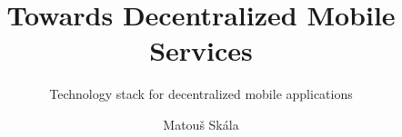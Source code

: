 \documentclass[whitelogo]{tudelft-report}
\begin{document}
\frontmatter


\title[tudelft-white]{Towards Decentralized Mobile Services}
\subtitle[tudelft-black]{Technology stack for decentralized mobile applications}
\author[tudelft-white]{Matouš Skála}


%






\tableofcontents

\mainmatter



%

%

%

%

\appendix

%


\end{document}
